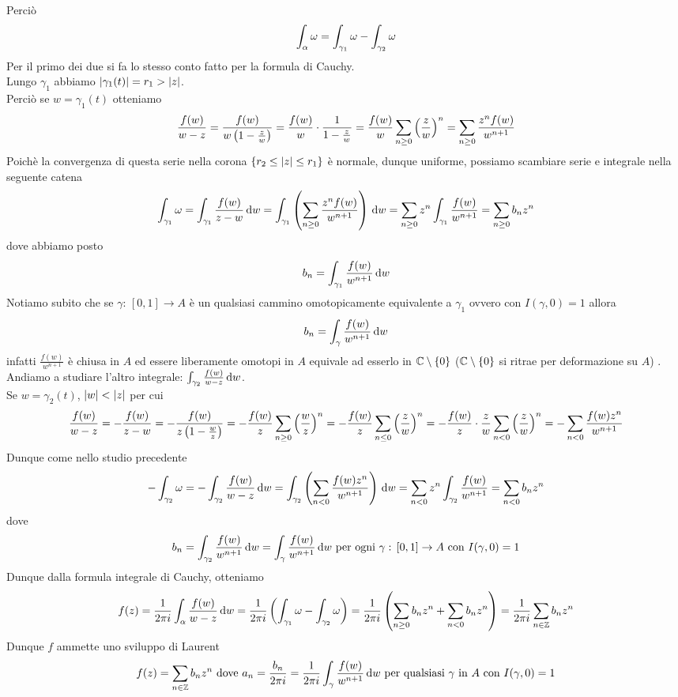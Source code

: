 \begin{thm}
Perci\`o 
$$ \int_{\alpha} \omega = \int_{\gamma_1} \omega - \int_{\gamma_2} \omega $$
Per il primo dei due si fa lo stesso conto fatto per la formula di Cauchy.\\
Lungo $\gamma_1$ abbiamo $\left\vert \gamma_1(t) \right\vert = r_1>\left\vert z \right\vert$.\\
Perci\`o se $w=\gamma_1(t)$ otteniamo 
$$\frac{f(w)}{w-z}  =\frac{f(w)}{w\left( 1-\frac{z}{w} \right)} =\frac{f(w)}{w} \cdot \frac{1}{1-\frac{z}{w}} = \frac{f(w)}{w} \sum_{n \geq 0 } \left( \frac{z}{w} \right)^n = \sum_{n \geq 0 }\frac{z^n f(w)}{w^{n+1}}$$
Poich\`e la convergenza di questa serie nella corona $\left\{ r_2\leq \left\vert z \right\vert \leq r_1 \right\}$ \`e normale, dunque uniforme, possiamo scambiare serie e integrale nella seguente catena
$$\int_{\gamma_1} \omega  =\int_{\gamma_1} \frac{f(w)}{z-w}\, \mathrm{d} w = \int_{\gamma_1} \left( \sum_{n\geq 0 } \frac{z^n f(w)}{w^{n+1}} \right) \, \mathrm{d} w = \sum_{n\geq 0 }z^n \int_{\gamma_1} \frac{f(w)}{w^{n+1}} =\sum_{n \geq 0  } b_n z^n$$
dove abbiamo posto 
$$b_n = \int_{\gamma_1} \frac{f(w)}{w^{n+1}} \, \mathrm{d} w $$
Notiamo subito che se $\gamma: \, [0,1]\to A$ \`e un qualsiasi cammino omotopicamente equivalente a $\gamma_1$ ovvero  con $I(\gamma, 0)=1$ allora 
$$b_n =\int_{\gamma} \frac{f(w)}{w^{n+1}}\, \mathrm{d} w $$
infatti $\frac{f(w)}{w^{n+1}}$ \`e chiusa in $A$ ed essere liberamente omotopi in $A$ equivale ad esserlo in $\mathbb{C} 
\setminus \left\{ 0 \right\} $ ($\mathbb{C}\setminus \left\{ 0 \right\} $ si ritrae per deformazione su $A$) .\\
Andiamo a studiare l'altro integrale: $\int_{\gamma_2} \frac{f(w)}{w-z} \, \mathrm{d} w $.\\
Se $ w=\gamma_2(t)$, $\left\vert w \right\vert < \left\vert z \right\vert $ per cui 
$$ \frac{f(w)}{w-z} = -\frac{f(w)}{z-w} = -\frac{f(w)}{z\left( 1-\frac{w}{z} \right)} = - \frac{f(w)}{z} \sum_{n \geq 0 } \left( \frac{w}{z} \right)^n  =-\frac{f(w)}{z} \sum_{n\leq 0 } \left( \frac{z}{w} \right)^n  =-\frac{f(w)}{z}\cdot \frac{z}{w} \sum_{n <0} \left( \frac{z}{w} \right)^n  =-\sum_{n <0} \frac{f(w)z^n}{w^{n+1}}$$
Dunque come nello studio precedente
$$ -\int_{\gamma_2} \omega = -\int_{\gamma_2} \frac{f(w)}{w-z}\, \mathrm{d} w  = \int_{\gamma_2} \left( \sum_{n<0} \frac{f(w) z^n}{w^{n+1}} \right) \, \mathrm{d} w  = \sum_{n<0} z^n \int_{\gamma_2} \frac{f(w)}{w^{n+1}} = \sum_{n<0} b_n z^n$$
dove
$$ b_n =\int_{\gamma_2} \frac{f(w)}{w^{n+1}} \, \mathrm{d} w =\int_{\gamma} \frac{f(w)}{w^{n+1}} \, \mathrm{d} w \text{ per ogni } \gamma:\, [0,1]\to A \text{ con } I(\gamma,0)=1$$
Dunque dalla formula integrale di Cauchy, otteniamo 
$$ f(z)= \frac{1}{2\pi i } \int_{\alpha} \frac{f(w)}{w-z} \, \mathrm{d} w = \frac{1}{2 \pi i }\left( \int_{\gamma_1} \omega - \int_{\gamma_2} \omega  \right) =\frac{1}{2\pi i } \left( \sum_{n \geq 0 } b_n z^n + \sum_{n<0} b_n z^n  \right) = \frac{1}{2\pi i } \sum_{n \in \mathbb{Z}} b_n z^n $$
Dunque $f$ ammette uno sviluppo di Laurent 
$$ f(z) = \sum_{n \in \mathbb{Z}} b_n z^n \text{ dove } a_n = \frac{b_n}{2\pi i } =\frac{1}{2\pi i } \int_{\gamma} \frac{f(w)}{w^{n+1}} \, \mathrm{d} w \text{ per qualsiasi } \gamma \text{ in  } A \text{ con }  I(\gamma,0)=1$$
\end{thm}
